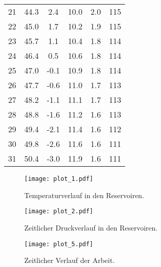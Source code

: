 \begin{table}[H]
\begin{tabular}{S[table-format=2.0] S S S S S[table-format=3.0]}
    21 & 44.3 &  2.4 & 10.0 & 2.0 & 115 \\
    22 & 45.0 &  1.7 & 10.2 & 1.9 & 115 \\
    23 & 45.7 &  1.1 & 10.4 & 1.8 & 114 \\
    24 & 46.4 &  0.5 & 10.6 & 1.8 & 114 \\
    25 & 47.0 & {-0.1} & 10.9 & 1.8 & 114 \\
    26 & 47.7 & {-0.6} & 11.0 & 1.7 & 113 \\
    27 & 48.2 & {-1.1} & 11.1 & 1.7 & 113 \\
    28 & 48.8 & {-1.6} & 11.2 & 1.6 & 113 \\
    29 & 49.4 & {-2.1} & 11.4 & 1.6 & 112 \\
    30 & 49.8 & {-2.6} & 11.6 & 1.6 & 111 \\
    31 & 50.4 & {-3.0} & 11.9 & 1.6 & 111 \\
    \bottomrule
  \end{tabular}
\end{table}



\begin{figure}
  \centering
  \texttt{[image: plot\_1.pdf]}
  \caption{Temperaturverlauf in den Reservoiren.}
  \label{fig:plot1}
\end{figure}




\begin{figure}
  \centering
  \texttt{[image: plot\_2.pdf]}
  \caption{Zeitlicher Druckverlauf in den Reservoiren.}
  \label{fig:plot3}
\end{figure}


\begin{figure}
  \centering
  \texttt{[image: plot\_5.pdf]}
  \caption{Zeitlicher Verlauf der Arbeit.}
  \label{fig:plot5}
\end{figure}
